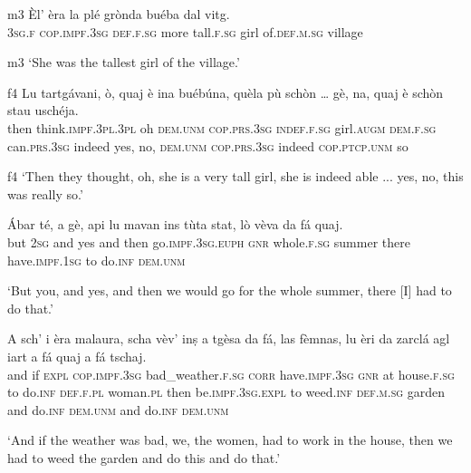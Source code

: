 \begin{linenumbers}
	\gll  {\ob}m3{\cb} Èl’ èra la plé grònda buéba dal vitg.  \\
{} \textsc{3sg.f} \textsc{cop.impf.3sg} \textsc{def.f.sg} more tall.\textsc{f.sg} girl of.\textsc{def.m.sg} village	\\
\end{linenumbers}
\medskip
\glt {\ob}m3{\cb} `She was the tallest girl of the village.'
\medskip

\begin{linenumbers}
	\gll {\ob}f4{\cb} Lu tartgávani, ò, quaj è ina buébúna, quèla pù schòn … gè, na, quaj è schòn stau uschéja.    \\
	{} then think.\textsc{impf.3pl.3pl} oh \textsc{dem.unm} \textsc{cop.prs.3sg} \textsc{indef.f.sg} girl.\textsc{augm} \textsc{dem.f.sg} can.\textsc{prs.3sg} indeed {} yes, no, \textsc{dem.unm} \textsc{cop.prs.3sg} indeed \textsc{cop.ptcp.unm} so\\
\end{linenumbers}
\medskip
\glt {\ob}f4{\cb} `Then they thought, oh, she is a very tall girl, she is indeed able ... yes, no, this was really so.'
\medskip

\begin{linenumbers}
	\gll Ábar té, a gè, api lu mavan ins tùta stat, lò vèva da fá quaj.\\
	but \textsc{2sg} and yes and then go.\textsc{impf.3sg.euph} \textsc{gnr} whole.\textsc{f.sg} summer there have.\textsc{impf.1sg} to  do.\textsc{inf} \textsc{dem.unm}\\
\end{linenumbers}
\medskip
\glt `But you, and yes, and then we would go for the whole summer, there [I] had to do that.'
\medskip

\begin{linenumbers}
	\gll A sch’ i èra malaura, scha vèv’ inṣ a tgèsa da fá, las fèmnas, lu èri da zarclá agl iart a fá quaj a fá tschaj.\\
	and if \textsc{expl} \textsc{cop.impf.3sg} bad\_weather.\textsc{f.sg} \textsc{corr} have.\textsc{impf.3sg} \textsc{gnr} at house.\textsc{f.sg} to do.\textsc{inf} \textsc{def.f.pl} woman.\textsc{pl} then be.\textsc{impf.3sg.expl} to weed.\textsc{inf} \textsc{def.m.sg} garden and do.\textsc{inf} \textsc{dem.unm} and do.\textsc{inf} \textsc{dem.unm}\\
\end{linenumbers}
\medskip
\glt `And if the weather was bad, we, the women, had to work in the house, then we had to weed the garden and do this and do that.'
\medskip

